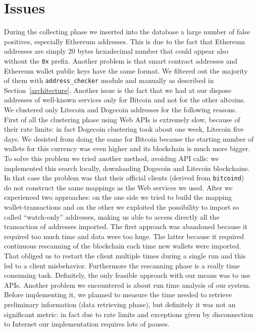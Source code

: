 \section{Issues} \label{sec:issues}
During the collecting phase we inserted into the database a large number of
false positives, especially Ethereum addresses. This is due to the fact that
Ethereum addresses are simply 20 bytes hexadecimal number that could appear
also without the \texttt{0x} prefix. Another problem is that smart contract
addresses and Ethereum wallet public keys have the same format. We filtered out
the majority of them with \texttt{address\_checker} module and manually as
described in Section~\ref{architecture}.
Another issue is the fact that we had at our dispose addresses
of well-known services only for Bitcoin and not for the other altcoins.
We clustered only Litecoin and Dogecoin addresses for the following reasons.
First of all the clustering phase using Web APIs is extremely slow, because of
their rate limits: in fact Dogecoin clustering took about one week, Litecoin
five days.
We desisted from doing the same for Bitcoin because the starting number of
wallets for this currency was even higher and its blockchain is much more
bigger. To solve this problem we tried another method, avoiding API calls: we
implemented this search locally, downloading Dogecoin and Litecoin blockchains.
In that case the problem was that their official clients (derived from
\texttt{bitcoind}) do not construct the same mappings as the Web services we
used. After we experienced two approaches: on the one side we tried to build the
mapping wallet-transactions and on the other we exploited the possibility to
import so called ``watch-only'' addresses, making us able to access directly
all the transaction of addresses imported.
The first approach was abandoned because it required too much time and data
were too huge. The latter because it required continuous rescanning of the
blockchain each time new wallets were imported. That obliged us to restart the
client multiple times during a single run and this led to a client misbehavior.
Furthermore the rescanning phase is a really time consuming task.
Definitely, the only feasible approach with our means was to use APIs.
Another problem we encountered is about run time analysis of our
system. Before implementing it, we planned to measure the time needed to
retrieve preliminary information (data retrieving phase), but definitely it was
not an significant metric: in fact due to rate limits and exceptions given by
disconnection to Internet our implementation requires lots of pauses.